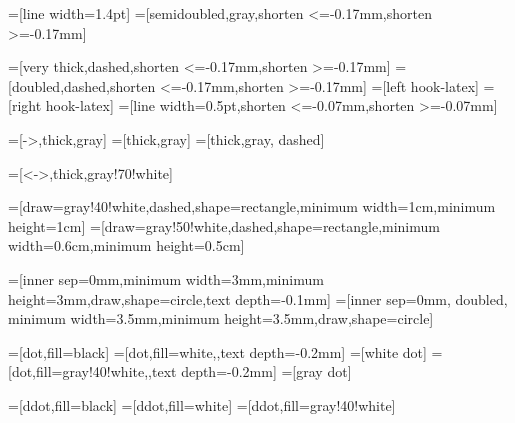 =[line width=1.4pt] %
=[semidoubled,gray,shorten <=-0.17mm,shorten >=-0.17mm]

=[very thick,dashed,shorten <=-0.17mm,shorten >=-0.17mm]
=[doubled,dashed,shorten <=-0.17mm,shorten >=-0.17mm]
=[left hook-latex]
=[right hook-latex]
=[line width=0.5pt,shorten <=-0.07mm,shorten >=-0.07mm]

=[->,thick,gray]
=[thick,gray]
=[thick,gray, dashed]

=[<->,thick,gray!70!white]

=[draw=gray!40!white,dashed,shape=rectangle,minimum width=1cm,minimum height=1cm]
=[draw=gray!50!white,dashed,shape=rectangle,minimum width=0.6cm,minimum height=0.5cm]

\newcommand{\measurement}{\tikz[scale=0.6]{ \draw [use as bounding box,draw=none] (0,-0.1) rectangle (1,0.7); \draw [fill=white] (1,0) arc (0:180:5mm); \draw (0,0) -- (1,0) (0.5,0) -- +(60:7mm);}}


=[inner sep=0mm,minimum width=3mm,minimum height=3mm,draw,shape=circle,text depth=-0.1mm]
=[inner sep=0mm, doubled, minimum width=3.5mm,minimum height=3.5mm,draw,shape=circle]

=[dot,fill=black]
=[dot,fill=white,,text depth=-0.2mm]
=[white dot] %
=[dot,fill=gray!40!white,,text depth=-0.2mm]
=[gray dot] %


=[ddot,fill=black]
=[ddot,fill=white]
=[ddot,fill=gray!40!white]

